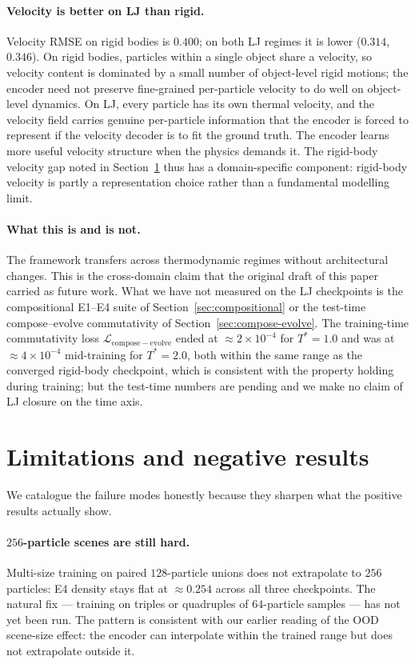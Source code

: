 \documentclass[11pt]{article}
\begin{document}
\paragraph{Velocity is better on LJ than rigid.} Velocity RMSE on rigid bodies is $0.400$; on both LJ regimes it is lower ($0.314$, $0.346$). On rigid bodies, particles within a single object share a velocity, so velocity content is dominated by a small number of object-level rigid motions; the encoder need not preserve fine-grained per-particle velocity to do well on object-level dynamics. On LJ, every particle has its own thermal velocity, and the velocity field carries genuine per-particle information that the encoder is forced to represent if the velocity decoder is to fit the ground truth. The encoder learns more useful velocity structure when the physics demands it. The rigid-body velocity gap noted in Section~\ref{sec:limitations} thus has a domain-specific component: rigid-body velocity is partly a representation choice rather than a fundamental modelling limit.

\paragraph{What this is and is not.} The framework transfers across thermodynamic regimes without architectural changes. This is the cross-domain claim that the original draft of this paper carried as future work. What we have not measured on the LJ checkpoints is the compositional E1--E4 suite of Section~\ref{sec:compositional} or the test-time compose--evolve commutativity of Section~\ref{sec:compose-evolve}. The training-time commutativity loss $\mathcal{L}_{\mathrm{compose-evolve}}$ ended at $\approx 2 \times 10^{-4}$ for $T^* = 1.0$ and was at $\approx 4 \times 10^{-4}$ mid-training for $T^* = 2.0$, both within the same range as the converged rigid-body checkpoint, which is consistent with the property holding during training; but the test-time numbers are pending and we make no claim of LJ closure on the time axis.

\section{Limitations and negative results}
\label{sec:limitations}

We catalogue the failure modes honestly because they sharpen what the positive results actually show.

\paragraph{$256$-particle scenes are still hard.} Multi-size training on paired $128$-particle unions does not extrapolate to $256$ particles: E4 density stays flat at $\approx 0.254$ across all three checkpoints. The natural fix --- training on triples or quadruples of $64$-particle samples --- has not yet been run. The pattern is consistent with our earlier reading of the OOD scene-size effect: the encoder can interpolate within the trained range but does not extrapolate outside it.
\end{document}
